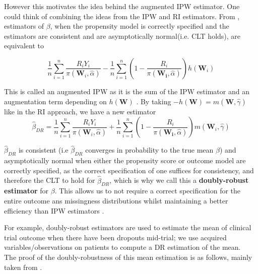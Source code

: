 \documentclass[12pt,twoside]{article}
\begin{document}
However this motivates the idea behind the augmented IPW estimator. One could think of combining the ideas from the IPW and RI estimators. From \citet{davidian}, estimators of $\beta$, when the propensity model is correctly specified and the estimators are consistent and are asymptotically normal(i.e. CLT holds), are equivalent to 

\begin{equation}
    \frac{1}{n}\sum_{i=1}^{n}\frac{R_iY_i}{\pi(\mathbf{W}_i, \hat{\alpha})} - \frac{1}{n}\sum_{i=1}^{n} \left(1 - \frac{R_i}{\pi(\mathbf{W_i},\hat{\alpha})} \right) h(\mathbf{W}_i)
\end{equation}

This is called an augmented IPW as it is the sum of the IPW estimator and an augmentation term depending on $h(\mathbf{W})$ \citep{davidian}. By taking $-h(\mathbf{W}) = m(\mathbf{W}, \hat{\gamma})$ like in the RI approach, we have a new estimator
\begin{equation}
    \hat\beta_{DR} = \frac{1}{n}\sum_{i=1}^{n}\frac{R_iY_i}{\pi(\mathbf{W}_i, \hat{\alpha})} + \frac{1}{n}\sum_{i=1}^{n} \left(1 - \frac{R_i}{\pi(\mathbf{W_i},\hat{\alpha})} \right) m(\mathbf{W}_i, \hat\gamma)
\end{equation}

$\hat\beta_{DR}$ is consistent (i.e $\hat\beta_{DR}$ converges in probability to the true mean $\beta$) and asymptotically normal when either the propensity score or outcome model are correctly specified, as the correct specification of one suffices for consistency, and therefore the CLT to hold for $\hat\beta_{DR}$, which is why we call this a \textbf{doubly-robust estimator} for $\beta$. This allows us to not require a correct specification for the entire outcome ans missingness distributions whilst maintaining a better efficiency than IPW estimators \citep{vansteelandt}.

For example, doubly-robust estimators are used to estimate the mean of clinical trial outcome when there have been dropouts mid-trial; we use acquired variables/observations on patients to compute a DR estimation of the mean. \\

The proof of the doubly-robustness of this mean estimation is as follows, mainly taken from \citet{vansteelandt}.
\end{document}
